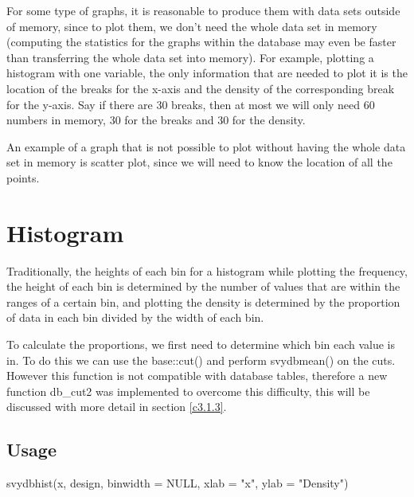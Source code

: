 For some type of graphs, it is reasonable to produce them with data sets outside of memory, since to plot them, we don't need the whole data set in memory (computing the statistics for the graphs within the database may even be faster than transferring the whole data set into memory). For example, plotting a histogram with one variable, the only information that are needed to plot it is the location of the breaks for the x-axis and the density of the corresponding break for the y-axis. Say if there are 30 breaks, then at most we will only need 60 numbers in memory, 30 for the breaks and 30 for the density. 

An example of a graph that is not possible to plot without having the whole data set in memory is scatter plot, since we will need to know the location of all the points.

\newpage
\section{Histogram} \label{c3.1}
Traditionally, the heights of each bin for a histogram while plotting the frequency, the height of each bin is determined by the number of values that are within the ranges of a certain bin, and plotting the density is determined by the proportion of data in each bin divided by the width of each bin.

To calculate the proportions, we first need to determine which bin each value is in. To do this we can use the {\ttfamily base::cut()} and perform {\ttfamily svydbmean()} on the cuts. However this function is not compatible with database tables, therefore a new function {\ttfamily db\_cut2} was implemented to overcome this difficulty, this will be discussed with more detail in section \ref{c3.1.3}.

\subsection{Usage} \label{c.3.1.1}
\begin{center}
    {\ttfamily svydbhist(x, design, binwidth = NULL, xlab = "x", ylab = "Density")}
\end{center}
